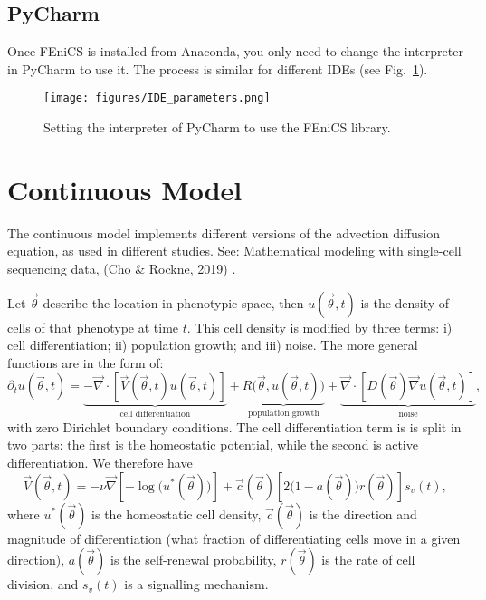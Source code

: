 \documentclass[11pt,oneside]{article}   	%
\newcommand{\vtheta}{\vec{\theta}}
\newcommand{\grad}{\vec{\nabla}}
\newcommand{\fenics}{FEniCS\xspace}
\renewcommand{\figurename}{Fig.}
\newcommand{\figref}[1]{\figurename~\ref{#1}}
\begin{document}
\subsection{PyCharm}
Once \fenics is installed from Anaconda, you only need to change the interpreter in PyCharm to use it.
The process is similar for different IDEs (see \figref{fig:IDE_parameters}).

\begin{figure}[h]
\centering
\texttt{[image: figures/IDE\_parameters.png]}
\caption{Setting the interpreter of PyCharm to use the \fenics library.}
\label{fig:IDE_parameters}
\end{figure}


\section{Continuous Model}
The continuous model implements different versions of the advection diffusion equation, as used in different studies. 
See: Mathematical modeling with single-cell sequencing data, (Cho \& Rockne, 2019) \cite{cho:bioRxiv:2019}.

Let $\vtheta$ describe the location in phenotypic space, then $u(\vtheta,t)$ is the density of cells of that phenotype at time $t$.
This cell density is modified by three terms:
i) cell differentiation; ii) population growth; and iii) noise.
The more general functions are in the form of:
\begin{equation}
\partial_t u(\vtheta,t) =
\underbrace{-\grad \cdot \left[\vec{V}(\vtheta,t) u(\vtheta,t)\right]}_{\text{cell differentiation}} +
\underbrace{R\bigl(\vtheta, u(\vtheta,t)\bigr)}_{\text{population growth}} +
\underbrace{\grad \cdot \left[D(\vtheta) \grad u(\vtheta,t)\right]}_{\text{noise}},
\label{eq:PDE}
\end{equation}
with zero Dirichlet boundary conditions.
The cell differentiation term is is split in two parts: the first is the homeostatic potential, while the second is active differentiation.
We therefore have
\begin{equation}
\vec{V}(\vtheta,t) =
- \nu \grad \left[-\log\bigl(u^*(\vtheta)\bigr)\right] +
\vec{c}(\vtheta) \left[2\bigl(1-a(\vtheta)\bigr)r(\vtheta)\right]s_v(t),
\end{equation}
where $u^*(\vtheta)$ is the homeostatic cell density, $\vec{c}(\vtheta)$ is the direction and magnitude of differentiation (what fraction of differentiating cells move in a given direction), $a(\vtheta)$ is the self-renewal probability, $r(\vtheta)$ is the rate of cell division, and $s_v(t)$ is a signalling mechanism.
\end{document}
